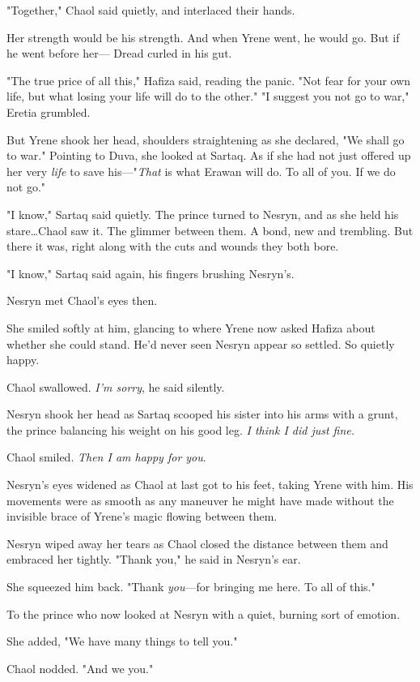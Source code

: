 "Together," Chaol said quietly, and interlaced their hands.

Her strength would be his strength.
And when Yrene went, he would go.
But if he went before her--- Dread curled in his gut.

"The true price of all this," Hafiza said, reading the panic.
"Not fear for your own life, but what losing your life will do to the other."
"I suggest you not go to war," Eretia grumbled.

But Yrene shook her head, shoulders straightening as she declared, "We shall go to war."
Pointing to Duva, she looked at Sartaq.
As if she had not just offered up her very \emph{life} to save his---"\emph{That} is what Erawan will do.
To all of you.
If we do not go."

"I know," Sartaq said quietly.
The prince turned to Nesryn, and as she held his stare\ldots Chaol saw it.
The glimmer between them.
A bond, new and trembling.
But there it was, right along with the cuts and wounds they both bore.

"I know," Sartaq said again, his fingers brushing Nesryn's.

Nesryn met Chaol's eyes then.

She smiled softly at him, glancing to where Yrene now asked Hafiza about whether she could stand.
He'd never seen Nesryn appear so 
settled.
So quietly happy.

Chaol swallowed.
\emph{I'm sorry}, he said silently.

Nesryn shook her head as Sartaq scooped his sister into his arms with a grunt, the prince balancing his weight on his good leg.
\emph{I think I did just fine.}

Chaol smiled.
\emph{Then I am happy for you}.

Nesryn's eyes widened as Chaol at last got to his feet, taking Yrene with him.
His movements were as smooth as any maneuver he might have made without the invisible brace of Yrene's magic flowing between them.

Nesryn wiped away her tears as Chaol closed the distance between them and embraced her tightly.
"Thank you," he said in Nesryn's ear.

She squeezed him back.
"Thank \emph{you}---for bringing me here.
To all of this."

To the prince who now looked at Nesryn with a quiet, burning sort of emotion.

She added, "We have many things to tell you."

Chaol nodded.
"And we you."

